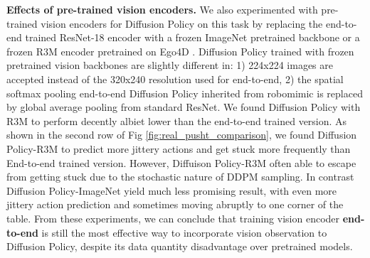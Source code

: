 \textbf{Effects of pre-trained vision encoders.}
We also experimented with pre-trained vision encoders for Diffusion Policy on this task by replacing the end-to-end trained ResNet-18 encoder with a frozen ImageNet \cite{deng2009imagenet} pretrained backbone or a frozen R3M encoder \cite{nair2022r3m} pretrained on Ego4D \cite{grauman2022ego4d}. Diffusion Policy trained with frozen pretrained vision backbones are slightly different in: 1) 224x224 images are accepted instead of the 320x240 resolution used for end-to-end, 2) the spatial softmax pooling end-to-end Diffusion Policy inherited from robomimic \cite{robomimic} is replaced by global average pooling from standard ResNet. We found Diffusion Policy with R3M to perform decently albiet lower than the end-to-end trained version. As shown in the second row of Fig \ref{fig:real_pusht_comparison}, we found Diffusion Policy-R3M to predict more jittery actions and get stuck more frequently than End-to-end trained version. However, Diffuison Policy-R3M often able to escape from getting stuck due to the stochastic nature of DDPM sampling. In contrast Diffusion Policy-ImageNet yield much less promising result, with even more jittery action prediction and sometimes moving abruptly to one corner of the table. From these experiments, we can conclude that training vision encoder \textbf{end-to-end} is still the most effective way to incorporate vision observation to Diffusion Policy, despite its data quantity disadvantage over pretrained models.

